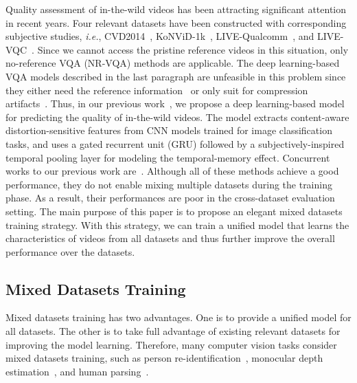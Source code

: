 \documentclass[twocolumn]{svjour3}          \smartqed  \usepackage{graphicx}
\begin{document}
Quality assessment of in-the-wild videos has been attracting significant attention in recent years. 
Four relevant datasets have been constructed with corresponding subjective studies, \textit{i.e.}, CVD2014~\citep{nuutinen2016cvd2014}, KoNViD-1k~\citep{hosu2017konstanz}, LIVE-Qualcomm~\citep{ghadiyaram2018capture}, and LIVE-VQC~\citep{sinno2019large}.
Since we cannot access the pristine reference videos in this situation, only no-reference VQA (NR-VQA) methods are applicable. 
The deep learning-based VQA models described in the last paragraph are unfeasible in this problem since they either need the reference information~\citep{zhang2018blind,kim2018deep,zhang2019objective} or only suit for compression artifacts~\citep{liu2018end}.
Thus, in our previous work~\citep{li2019quality}, we propose a deep learning-based model for predicting the quality of in-the-wild videos. 
The model extracts content-aware distortion-sensitive features from CNN models trained for image classification tasks, and uses a gated recurrent unit (GRU) followed by a subjectively-inspired temporal pooling layer for modeling the temporal-memory effect.
Concurrent works to our previous work are~\citet{you2019deep,varga2019no1,varga2019no2}. 
Although all of these methods achieve a good performance, they do not enable mixing multiple datasets during the training phase. 
As a result, their performances are poor in the cross-dataset evaluation setting. 
The main purpose of this paper is to propose an elegant mixed datasets training strategy. 
With this strategy, we can train a unified model that learns the characteristics of videos from all datasets and thus further improve the overall performance over the datasets.
\subsection{Mixed Datasets Training}
\label{sec:mdt}
\indent\indent Mixed datasets training has two advantages. 
One is to provide a unified model for all datasets. 
The other is to take full advantage of existing relevant datasets for improving the model learning.
Therefore, many computer vision tasks consider mixed datasets training, such as person re-identification~\citep{lv2018unsupervised,li2019cross}, monocular depth estimation~\citep{lasinger2019towards}, and human parsing~\citep{he2019grapy}.
\end{document}

